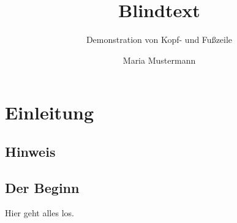 \documentclass{scrreprt}
\title{Blindtext}
\subtitle{Demonstration von Kopf- und Fußzeile}
\author{Maria Mustermann}
\begin{document}
  \maketitle
  \tableofcontents

  \chapter{Einleitung}

  \blindtext{}

  \blindtext\marginpar{\rule{\marginparwidth}{1pt}}

  \Blindtext\marginpar{\blindtext}

  \section{Hinweis}

  \blindtext

  \blindtext

  \blindtext

  \section{Der Beginn}

  Hier geht alles los.

\end{document}
